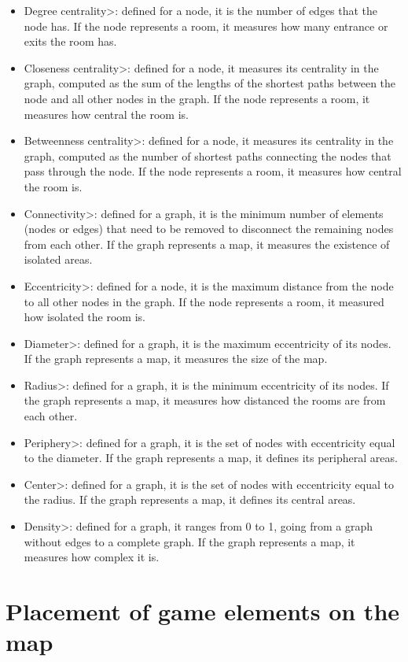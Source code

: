 \begin{itemize}
\item \<Degree centrality>: defined for a node, it is the number of edges that the node has. If the node represents a room, it measures how many entrance or exits the room has. 
\item \<Closeness centrality>: defined for a node, it measures its centrality in the graph, computed as the sum of the lengths of the shortest paths between the node and all other nodes in the graph. If the node represents a room, it measures how central the room is.
\item \<Betweenness centrality>: defined for a node, it measures its centrality in the graph, computed as the number of shortest paths connecting the nodes that pass through the node. If the node represents a room, it measures how central the room is.
\item \<Connectivity>: defined for a graph, it is the minimum number of elements (nodes or edges) that need to be removed to disconnect the remaining nodes from each other. If the graph represents a map, it measures the existence of isolated areas.
\item \<Eccentricity>: defined for a node, it is the maximum distance from the node to all other nodes in the graph. If the node represents a room, it measured how isolated the room is.
\item \<Diameter>: defined for a graph, it is the maximum eccentricity of its nodes. If the graph represents a map, it measures the size of the map.
\item \<Radius>: defined for a graph, it is the minimum eccentricity of its nodes. If the graph represents a map, it measures how distanced the rooms are from each other.
\item \<Periphery>: defined for a graph, it is the set of nodes with eccentricity equal to the diameter. If the graph represents a map, it defines its peripheral areas.
\item \<Center>: defined for a graph, it is the set of nodes with eccentricity equal to the radius. If the graph represents a map, it defines its central areas.
\item \<Density>: defined for a graph, it ranges from 0 to 1, going from a graph without edges to a complete graph. If the graph represents a map, it measures how complex it is.
\end{itemize}


\section{Placement of game elements on the map}

